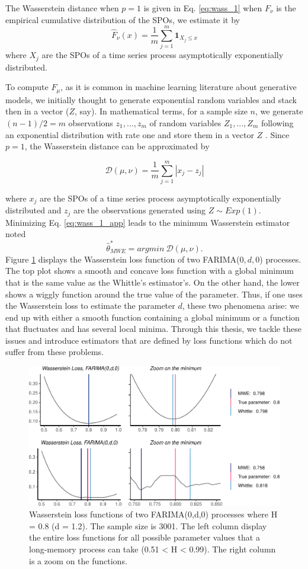 \documentclass[
  11pt,
]{article}
\begin{document}
The Wasserstein distance when \(p=1\) is given in Eq. \ref{eq:wass_1}
when \(F_{\nu}\) is the empirical cumulative distribution of the SPOs,
we estimate it by \[
\hat{F}_{\nu}(x)=\frac{1}{m} \sum_{j=1}^{m} \mathbf{1}_{X_{j} \leq x}
\] where \(X_{j}\) are the SPOs of a time series process asymptotically
exponentially distributed.

To compute \(F_\mu\), as it is common in machine learning literature
about generative models, we initially thought to generate exponential
random variables and stack then in a vector (\(Z\), say). In
mathematical terms, for a sample size \(n\), we generate \((n-1)/2 = m\)
observations \(z_1, ..., z_m\) of random variables \(Z_1, ..., Z_m\)
following an exponential distribution with rate one and store them in a
vector \(Z\) . Since \(p = 1\), the Wasserstein distance can be
approximated by

\begin{equation}
\mathcal{D}(\mu, \nu) = \frac{1}{m} \sum_{j = 1}^{m} |x_j - z_j| 
\label{eq:wass_1_app}
\end{equation}

where \(x_j\) are the SPOs of a time series process asymptotically
exponentially distributed and \(z_j\) are the observations generated
using \(Z \sim Exp(1)\). Minimizing Eq. \ref{eq:wass_1_app} leads to the
minimum Wasserstein estimator noted \[
\hat \theta^*_{MWE} = argmin \  \mathcal{D}(\mu, \nu).
\] Figure \ref{fig:wasserstein_farima} displays the Wasserstein loss
function of two FARIMA(\(0,d,0\)) processes. The top plot shows a smooth
and concave loss function with a global minimum that is the same value
as the Whittle's estimator's. On the other hand, the lower shows a
wiggly function around the true value of the parameter. Thus, if one
uses the Wasserstein loss to estimate the parameter \(d\), these two
phenomena arise: we end up with either a smooth function containing a
global minimum or a function that fluctuates and has several local
minima. Through this thesis, we tackle these issues and introduce
estimators that are defined by loss functions which do not suffer from
these problems.

\begin{figure}

{\centering \includegraphics[width=0.6\linewidth]{Master_thesis_V2_files/figure-latex/wasserstein_farima-1} 

}

\caption{Wasserstein loss functions of two FARIMA(0,d,0) processes where H = 0.8 (d = 1.2). The sample size is 3001. The left column display the entire loss functions for all possible parameter values that a long-memory process can take (0.51 < H < 0.99). The right column is a zoom on the functions.}\label{fig:wasserstein_farima}
\end{figure}
\end{document}
